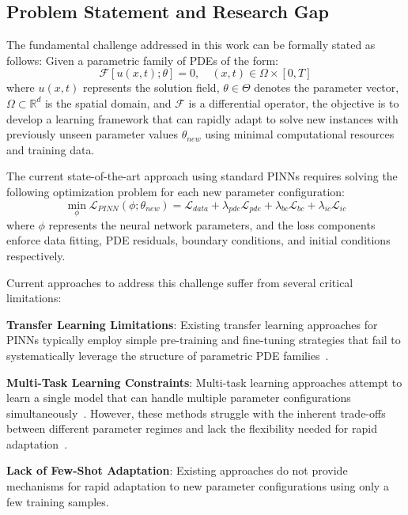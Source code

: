\documentclass[review]{elsarticle}
\begin{document}
\subsection{Problem Statement and Research Gap}

The fundamental challenge addressed in this work can be formally stated as follows: Given a parametric family of PDEs of the form:
\begin{equation}
\mathcal{F}[u(x,t); \theta] = 0, \quad (x,t) \in \Omega \times [0,T]
\end{equation}
where $u(x,t)$ represents the solution field, $\theta \in \Theta$ denotes the parameter vector, $\Omega \subset \mathbb{R}^d$ is the spatial domain, and $\mathcal{F}$ is a differential operator, the objective is to develop a learning framework that can rapidly adapt to solve new instances with previously unseen parameter values $\theta_{new}$ using minimal computational resources and training data.

The current state-of-the-art approach using standard PINNs requires solving the following optimization problem for each new parameter configuration:
\begin{equation}
\min_{\phi} \mathcal{L}_{PINN}(\phi; \theta_{new}) = \mathcal{L}_{data} + \lambda_{pde} \mathcal{L}_{pde} + \lambda_{bc} \mathcal{L}_{bc} + \lambda_{ic} \mathcal{L}_{ic}
\end{equation}
where $\phi$ represents the neural network parameters, and the loss components enforce data fitting, PDE residuals, boundary conditions, and initial conditions respectively.

Current approaches to address this challenge suffer from several critical limitations:

\textbf{Transfer Learning Limitations}: Existing transfer learning approaches for PINNs typically employ simple pre-training and fine-tuning strategies that fail to systematically leverage the structure of parametric PDE families~\cite{goswami2020transfer,chakraborty2021transfer}.

\textbf{Multi-Task Learning Constraints}: Multi-task learning approaches attempt to learn a single model that can handle multiple parameter configurations simultaneously~\cite{pan2009survey}. However, these methods struggle with the inherent trade-offs between different parameter regimes and lack the flexibility needed for rapid adaptation~\cite{hospedales2021meta}.

\textbf{Lack of Few-Shot Adaptation}: Existing approaches do not provide mechanisms for rapid adaptation to new parameter configurations using only a few training samples.
\end{document}

